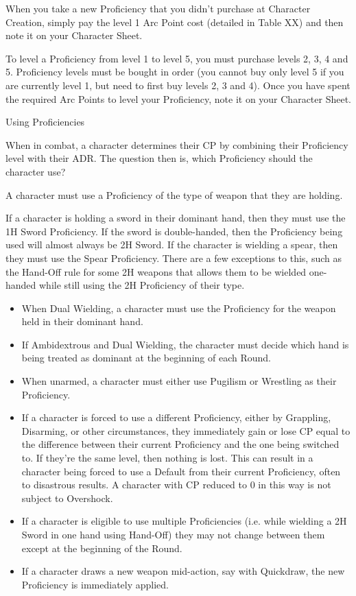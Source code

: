 \documentclass[oneside,11pt,english]{book}
\begin{document}
 

When you take a new Proficiency that you didn’t purchase at Character Creation, simply pay the level 1 
Arc Point cost (detailed in Table XX) and then note it on your Character Sheet. 

 

To level a Proficiency from level 1 to level 5, you must purchase levels 2, 3, 4 and 5. Proficiency levels 
must be bought in order (you cannot buy only level 5 if you are currently level 1, but need to first buy 
levels 2, 3 and 4). Once you have spent the required Arc Points to level your Proficiency, note it on your 
Character Sheet. 

 

Using Proficiencies 

 

When in combat, a character determines their CP by combining their Proficiency level with their ADR. 
The question then is, which Proficiency should the character use? 

 

A character must use a Proficiency of the type of weapon that they are holding. 

 

If a character is holding a sword in their dominant hand, then they must use the 1H Sword Proficiency. If 
the sword is double-handed, then the Proficiency being used will almost always be 2H Sword. If the 
character is wielding a spear, then they must use the Spear Proficiency. There are a few exceptions to this, 
such as the Hand-Off rule for some 2H weapons that allows them to be wielded one-handed while still 
using the 2H Proficiency of their type. 
\begin{itemize}
\item When Dual Wielding, a character must use the Proficiency for the weapon held in their dominant 
hand. 
\item If Ambidextrous and Dual Wielding, the character must decide which hand is being treated as 
dominant at the beginning of each Round. 
\item When unarmed, a character must either use Pugilism or Wrestling as their Proficiency. 
\item If a character is forced to use a different Proficiency, either by Grappling, Disarming, or other 
circumstances, they immediately gain or lose CP equal to the difference between their current 
Proficiency and the one being switched to. If they’re the same level, then nothing is lost. This can 
result in a character being forced to use a Default from their current Proficiency, often to 
disastrous results. A character with CP reduced to 0 in this way is not subject to Overshock. 
\item If a character is eligible to use multiple Proficiencies (i.e. while wielding a 2H Sword in one hand 
using Hand-Off) they may not change between them except at the beginning of the Round. 
\item If a character draws a new weapon mid-action, say with Quickdraw, the new Proficiency is 
immediately applied. 
\end{itemize}
 
\end{document}
